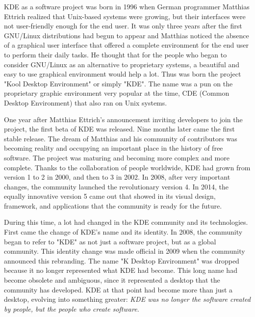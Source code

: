 

\noindent{}KDE as a software project was born in 1996 when German programmer Matthias Ettrich realized that Unix-based systems were growing, but their interfaces were not user-friendly enough for the end user. It was only three years after the first GNU/Linux distributions had begun to appear and Matthias noticed the absence of a graphical user interface that offered a complete environment for the end user to perform their daily tasks. He thought that for the people who began to consider GNU/Linux as an alternative to proprietary systems, a beautiful and easy to use graphical environment would help a lot. Thus was born the project "Kool Desktop Environment" or simply "KDE". The name was a pun on the proprietary graphic environment very popular at the time, CDE (Common Desktop Environment) that also ran on Unix systems.

One year after Matthias Ettrich's announcement inviting developers to join the project, the first beta of KDE was released. Nine months later came the first stable release. The dream of Matthias and his community of contributors was becoming reality and occupying an important place in the history of free software. The project was maturing and becoming more complex and more complete. Thanks to the collaboration of people worldwide, KDE had grown from version 1 to 2 in 2000, and then to 3 in 2002. In 2008, after very important changes, the community launched the revolutionary version 4. In 2014, the equally innovative version 5 came out that showed in its visual design, framework, and applications that the community is ready for the future.

During this time, a lot had changed in the KDE community and its technologies. First came the change of KDE's name and its identity. In 2008, the community began to refer to "KDE" as not just a software project, but as a global community. This identity change was made official in 2009 when the community announced this rebranding. The name "K Desktop Environment" was dropped because it no longer represented what KDE had become. This long name had become obsolete and ambiguous, since it represented a desktop that the community has developed. KDE at that point had become more than just a desktop, evolving into something greater: \textit{KDE was no longer the software created by people, but the people who create software.} 

